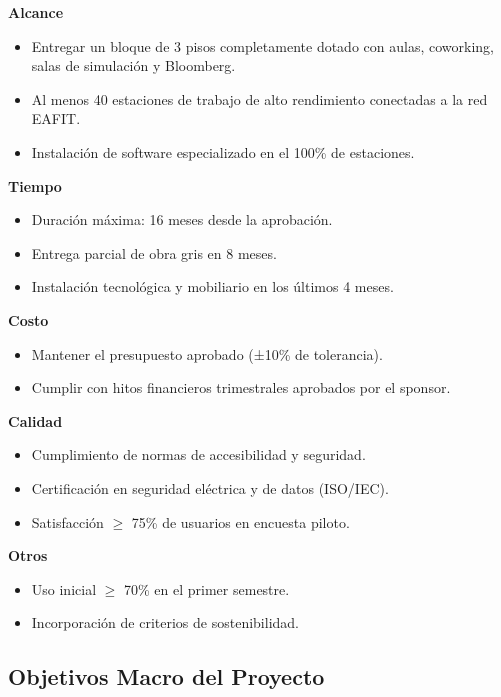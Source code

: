 \textbf{Alcance}
\begin{itemize}
    \item Entregar un bloque de 3 pisos completamente dotado con aulas, coworking, salas de simulación y Bloomberg.
    \item Al menos 40 estaciones de trabajo de alto rendimiento conectadas a la red EAFIT.
    \item Instalación de software especializado en el 100\% de estaciones.
\end{itemize}

\textbf{Tiempo}
\begin{itemize}
    \item Duración máxima: 16 meses desde la aprobación.
    \item Entrega parcial de obra gris en 8 meses.
    \item Instalación tecnológica y mobiliario en los últimos 4 meses.
\end{itemize}

\textbf{Costo}
\begin{itemize}
    \item Mantener el presupuesto aprobado (±10\% de tolerancia).
    \item Cumplir con hitos financieros trimestrales aprobados por el sponsor.
\end{itemize}

\textbf{Calidad}
\begin{itemize}
    \item Cumplimiento de normas de accesibilidad y seguridad.
    \item Certificación en seguridad eléctrica y de datos (ISO/IEC).
    \item Satisfacción $\geq$ 75\% de usuarios en encuesta piloto.
\end{itemize}

\textbf{Otros}
\begin{itemize}
    \item Uso inicial $\geq$ 70\% en el primer semestre.
    \item Incorporación de criterios de sostenibilidad.
\end{itemize}

\subsection{Objetivos Macro del Proyecto}


